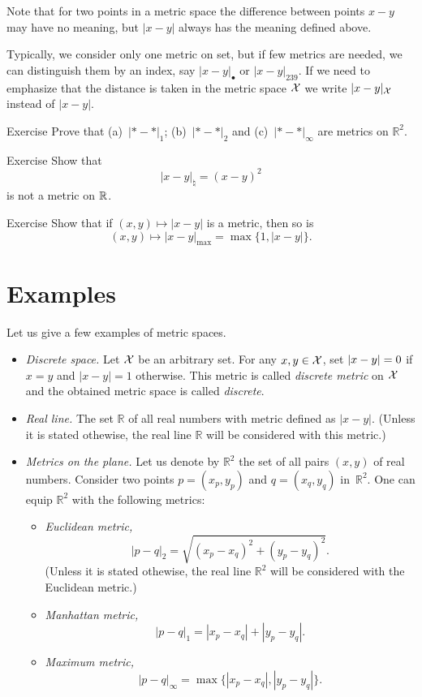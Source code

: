 Note that for two points in a metric space  the difference between points $x-y$ may have no meaning,
but $|x-y|$ always has the meaning defined above.

Typically, we consider only one metric on set, 
but if few metrics are needed, we can distinguish them by an index, say  $|x-y|_{\bullet}$ or $|x-y|_{239}$.
If we need to emphasize that the distance is taken in the metric space $\mathcal{X}$ we write $|x-y|_{\mathcal X}$ instead of $|x-y|$.

\begin{thm}{Exercise}\label{ex:d1+d2+dinfty}
Prove that (a)~$|{*}-{*}|_1$; (b)~$|{*}-{*}|_2$ and (c)~$|{*}-{*}|_\infty$ are metrics on $\mathbb{R}^2$.
\end{thm}

\begin{thm}{Exercise}\label{ex:not-a-metric}
Show that 
\[|x-y|_{\natural}=(x-y)^2\]
is not a metric on $\mathbb{R}$.
\end{thm}

\begin{thm}{Exercise}\label{ex:metric}
Show that if $(x,y)\mapsto |{x}-{y}|$ is a metric, then so is 
\[(x,y)\mapsto |{x}-{y}|_{\max}=\max\{1,|{x}-{y}|\}.\] 
\end{thm}

\section{Examples}\label{sec:examples(metric-spaces)}

Let us give a few examples of metric spaces.

\begin{itemize}
\item{}\emph{Discrete space.}\label{page:Discrete metric}
Let $\mathcal X$ be an arbitrary set. 
For any $x,y\z\in\c X$, 
set $|x-y|\z=0$ if $x=y$ and $|x-y|=1$ otherwise.
This metric is called \emph{discrete metric} on $\mathcal X$ and the obtained metric space is called {}\emph{discrete}.
\item{}\emph{Real line.} 
The set $\mathbb{R}$ of all real numbers with metric defined as 
$|x-y|$. 
(Unless it is stated othewise, the real line $\mathbb{R}$ will be considered with this metric.) 
\item {}\emph{Metrics on the plane.}\label{page:Metrics on the plane}
Let us denote by $\mathbb{R}^2$ the set of all pairs $(x,y)$ of real numbers.
Consider two points $p=(x_p,y_p)$ and $q=(x_q,y_q)$  in~$\mathbb{R}^2$.
One can equip $\mathbb{R}^2$ with the following metrics:
\begin{itemize}
\item{}\emph{Euclidean metric,} 
$$|p-q|_2=\sqrt{(x_p-x_q)^2+(y_p-y_q)^2}.$$
(Unless it is stated othewise, the real line $\mathbb{R}^2$ will be considered with the Euclidean metric.) 
\item\label{Manhattan plane}\emph{Manhattan metric,}  
$$|p-q|_1=|x_p-x_q|+|y_p-y_q|.$$
\item{}\emph{Maximum metric,} 
$$|p-q|_\infty=\max\{|x_p-x_q|,|y_p-y_q|\}.$$
\end{itemize}
\end{itemize}


